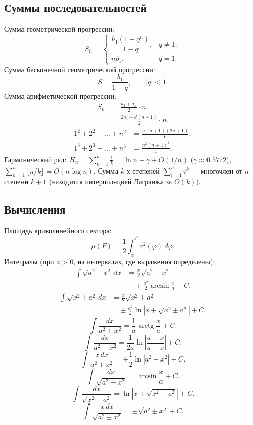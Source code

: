 \begingroup
\setlength{\parindent}{0pt}
\setlength{\parskip}{3pt}
\setlength{\abovedisplayskip}{5pt plus 1pt minus 1pt}
\setlength{\belowdisplayskip}{5pt plus 1pt minus 1pt}
\setlength{\abovedisplayshortskip}{3pt plus 1pt}
\setlength{\belowdisplayshortskip}{5pt plus 1pt minus 1pt}

\subsection{Суммы последовательностей}
Сумма геометрической прогрессии:
\[
  S_n = \begin{cases}
    \dfrac{b_1(1 - q^n)}{1 - q}, & q \ne 1, \\
    nb_1, & q = 1.
  \end{cases}
\]
Сумма бесконечной геометрической прогрессии:
\[
  S = \frac{b_1}{1 - q}, \qquad |q| < 1.
\]
Сумма арифметической прогрессии:
\[
  \begin{aligned}
    S_n &= \frac{a_1 + a_n}{2} \cdot n \\
        &= \frac{2a_1 + d(n - 1)}{2} \cdot n.
  \end{aligned}
\]
\[
  \begin{aligned}
    1^2 + 2^2 + \dots + n^2 &= \frac{n(n + 1)(2n + 1)}{6}, \\
    1^3 + 2^3 + \dots + n^3 &= \frac{n^2(n + 1)^2}{4}.
  \end{aligned}
\]
Гармонический ряд: $H_n=\sum_{k=1}^{n}\frac1k=\ln n+\gamma+O(1/n)$ ($\gamma\approx0.5772$), $\sum_{k=1}^{n}\lfloor n/k\rfloor=O(n\log n)$. Сумма $k$-х степеней $\sum_{i=1}^{n}i^k$ --- многочлен от $n$ степени $k+1$ (находится интерполяцией Лагранжа за $O(k)$).

\subsection{Вычисления}
Площадь криволинейного сектора:
\[
  \mu(F) = \frac{1}{2} \int_{\alpha}^{\beta} r^2(\varphi)\,d\varphi.
\]
Интегралы (при $a > 0$, на интервалах, где выражения определены):
\[
  \begin{aligned}
    \int \sqrt{a^2 - x^2}\,dx
      &= \frac{x}{2}\sqrt{a^2 - x^2} \\
      &\quad + \frac{a^2}{2}\arcsin\frac{x}{a} + C.
  \end{aligned}
\]
\[
  \begin{aligned}
    \int \sqrt{x^2 \pm a^2}\,dx
      &= \frac{x}{2}\sqrt{x^2 \pm a^2} \\
      &\quad \pm \frac{a^2}{2}\ln\left|x + \sqrt{x^2 \pm a^2}\right| + C.
  \end{aligned}
\]
\[
  \int \frac{dx}{a^2 + x^2}
    = \frac{1}{a}\operatorname{arctg}\frac{x}{a} + C.
\]
\[
  \int \frac{dx}{a^2 - x^2}
    = \frac{1}{2a}\ln\left|\frac{a + x}{a - x}\right| + C.
\]
\[
  \int \frac{x\,dx}{a^2 \pm x^2}
    = \pm\frac{1}{2}\ln|a^2 \pm x^2| + C.
\]
\[
  \int \frac{dx}{\sqrt{a^2 - x^2}}
    = \arcsin\frac{x}{a} + C.
\]
\[
  \int \frac{dx}{\sqrt{x^2 \pm a^2}}
    = \ln\left|x + \sqrt{x^2 \pm a^2}\right| + C.
\]
\[
  \int \frac{x\,dx}{\sqrt{a^2 \pm x^2}}
    = \pm\sqrt{a^2 \pm x^2} + C.
\]

